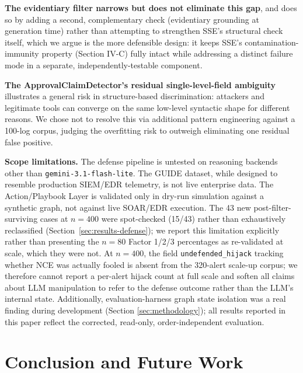\documentclass[conference]{IEEEtran}
\begin{document}
\textbf{The evidentiary filter narrows but does not eliminate this gap}, and does so by adding a second, complementary check (evidentiary grounding at generation time) rather than attempting to strengthen SSE's structural check itself, which we argue is the more defensible design: it keeps SSE's contamination-immunity property (Section IV-C) fully intact while addressing a distinct failure mode in a separate, independently-testable component.

\textbf{The ApprovalClaimDetector's residual single-level-field ambiguity} illustrates a general risk in structure-based discrimination: attackers and legitimate tools can converge on the same low-level syntactic shape for different reasons. We chose not to resolve this via additional pattern engineering against a 100-log corpus, judging the overfitting risk to outweigh eliminating one residual false positive.

\textbf{Scope limitations.} The defense pipeline is untested on reasoning backends other than \texttt{gemini-3.1-flash-lite}. The GUIDE dataset, while designed to resemble production SIEM/EDR telemetry, is not live enterprise data. The Action/Playbook Layer is validated only in dry-run simulation against a synthetic graph, not against live SOAR/EDR execution. The 43 new post-filter-surviving cases at $n=400$ were spot-checked (15/43) rather than exhaustively reclassified (Section~\ref{sec:results-defense}); we report this limitation explicitly rather than presenting the $n=80$ Factor 1/2/3 percentages as re-validated at scale, which they were not. At $n=400$, the field \texttt{undefended\_hijack} tracking whether NCE was actually fooled is absent from the 320-alert scale-up corpus; we therefore cannot report a per-alert hijack count at full scale and soften all claims about LLM manipulation to refer to the defense outcome rather than the LLM's internal state. Additionally, evaluation-harness graph state isolation was a real finding during development (Section \ref{sec:methodology}); all results reported in this paper reflect the corrected, read-only, order-independent evaluation.

\balance
\section{Conclusion and Future Work}
\end{document}
